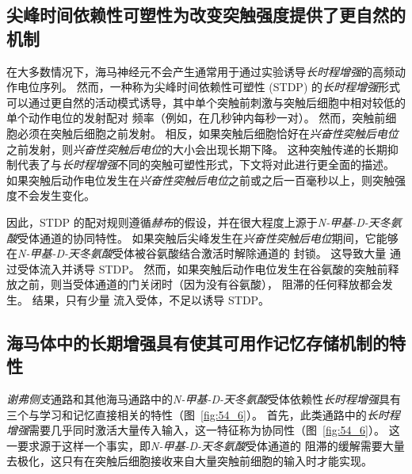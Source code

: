 \subsection{尖峰时间依赖性可塑性为改变突触强度提供了更自然的机制}

在大多数情况下，海马神经元不会产生通常用于通过实验诱导\textit{长时程增强}的高频动作电位序列。
然而，一种称为尖峰时间依赖性可塑性 (STDP) 的\textit{长时程增强}形式可以通过更自然的活动模式诱导，其中单个突触前刺激与突触后细胞中相对较低的单个动作电位的发射配对 频率（例如，在几秒钟内每秒一对）。
然而，突触前细胞必须在突触后细胞之前发射。 相反，如果突触后细胞恰好在\textit{兴奋性突触后电位}之前发射，则\textit{兴奋性突触后电位}的大小会出现长期下降。
这种突触传递的长期抑制代表了与\textit{长时程增强}不同的突触可塑性形式，下文将对此进行更全面的描述。
如果突触后动作电位发生在\textit{兴奋性突触后电位}之前或之后一百毫秒以上，则突触强度不会发生变化。


因此，STDP 的配对规则遵循\textit{赫布}的假设，并在很大程度上源于\textit{N-甲基-D-天冬氨酸}受体通道的协同特性。
如果突触后尖峰发生在\textit{兴奋性突触后电位}期间，它能够在\textit{N-甲基-D-天冬氨酸}受体被谷氨酸结合激活时解除通道的  封锁。
这导致大量  通过受体流入并诱导 STDP。
然而，如果突触后动作电位发生在谷氨酸的突触前释放之前，则当受体通道的门关闭时（因为没有谷氨酸）， 阻滞的任何释放都会发生。
结果，只有少量  流入受体，不足以诱导 STDP。



\subsection{海马体中的长期增强具有使其可用作记忆存储机制的特性}

\textit{谢弗侧支}通路和其他海马通路中的\textit{N-甲基-D-天冬氨酸}受体依赖性\textit{长时程增强}具有三个与学习和记忆直接相关的特性（图~\ref{fig:54_6}）。
首先，此类通路中的\textit{长时程增强}需要几乎同时激活大量传入输入，这一特征称为协同性（图~\ref{fig:54_6}）。
这一要求源于这样一个事实，即\textit{N-甲基-D-天冬氨酸}受体通道的  阻滞的缓解需要大量去极化，这只有在突触后细胞接收来自大量突触前细胞的输入时才能实现。


